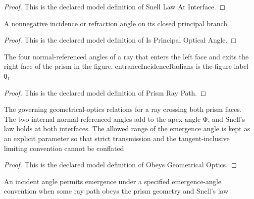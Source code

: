 \begin{proof}
  This is the declared model definition of Snell Law At Interface.
\end{proof}
\begin{definition}
  \label{def:physics:phyx-mini-0009:phyxminiproblems-problemphyxmini0009-isprincipalopticalangle}
  A nonnegative incidence or refraction angle on its closed principal branch
\end{definition}
\begin{proof}
  This is the declared model definition of Is Principal Optical Angle.
\end{proof}
\begin{definition}
  \label{def:physics:phyx-mini-0009:phyxminiproblems-problemphyxmini0009-prismraypath}
  The four normal-referenced angles of a ray that enters the left face and exits the right face of the prism in the figure. entranceIncidenceRadians is the figure label θ₁
\end{definition}
\begin{proof}
  This is the declared model definition of Prism Ray Path.
\end{proof}
\begin{definition}
  \label{def:physics:phyx-mini-0009:phyxminiproblems-problemphyxmini0009-prismraypath-obeysgeometricaloptics}
  The governing geometrical-optics relations for a ray crossing both prism faces. The two internal normal-referenced angles add to the apex angle Φ, and Snell's law holds at both interfaces. The allowed range of the emergence angle is kept as an explicit parameter so that strict transmission and the tangent-inclusive limiting convention cannot be conflated
\end{definition}
\begin{proof}
  This is the declared model definition of Obeys Geometrical Optics.
\end{proof}
\begin{definition}
  \label{def:physics:phyx-mini-0009:phyxminiproblems-problemphyxmini0009-canemerge}
  An incident angle permits emergence under a specified emergence-angle convention when some ray path obeys the prism geometry and Snell's law
\end{definition}

